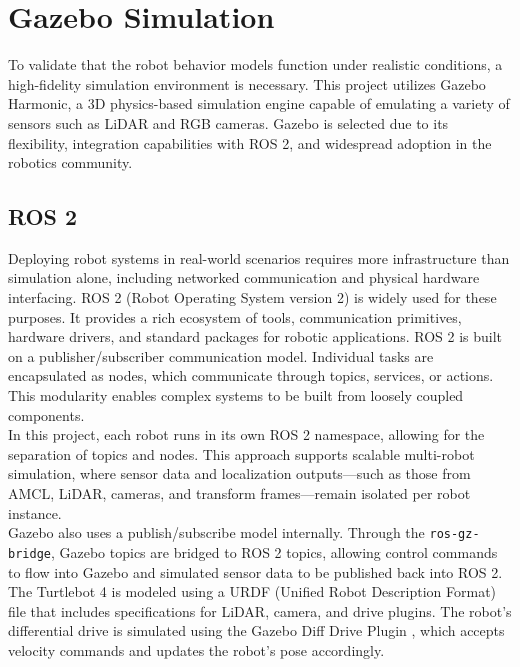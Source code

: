 \section{Gazebo Simulation}
To validate that the robot behavior models function under realistic conditions, a high-fidelity simulation environment is necessary. This project utilizes Gazebo Harmonic, a 3D physics-based simulation engine capable of emulating a variety of sensors such as LiDAR and RGB cameras. Gazebo is selected due to its flexibility, integration capabilities with ROS 2, and widespread adoption in the robotics community.

\subsection{ROS 2}
\label{sub:ros_2}
Deploying robot systems in real-world scenarios requires more infrastructure than simulation alone, including networked communication and physical hardware interfacing. ROS 2 (Robot Operating System version 2) is widely used for these purposes. It provides a rich ecosystem of tools, communication primitives, hardware drivers, and standard packages for robotic applications. ROS 2 is built on a publisher/subscriber communication model. Individual tasks are encapsulated as nodes, which communicate through topics, services, or actions. This modularity enables complex systems to be built from loosely coupled components. \\

In this project, each robot runs in its own ROS 2 namespace, allowing for the separation of topics and nodes. This approach supports scalable multi-robot simulation, where sensor data and localization outputs—such as those from AMCL, LiDAR, cameras, and transform frames—remain isolated per robot instance.\\

Gazebo also uses a publish/subscribe model internally. Through the \texttt{ros-gz-bridge}, Gazebo topics are bridged to ROS 2 topics, allowing control commands to flow into Gazebo and simulated sensor data to be published back into ROS 2.\\

The Turtlebot 4 is modeled using a URDF (Unified Robot Description Format) file that includes specifications for LiDAR, camera, and drive plugins. The robot’s differential drive is simulated using the Gazebo Diff Drive Plugin \cite{gz-diff-drive}, which accepts velocity commands and updates the robot's pose accordingly.

